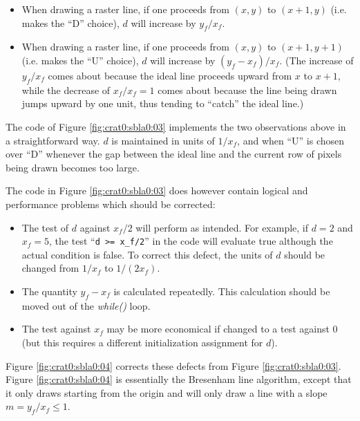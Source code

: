 \begin{itemize}
\item When drawing a raster line, if one proceeds from 
      $(x, y)$ to $(x+1, y)$ (i.e. makes the ``D'' choice),
      $d$ will increase by $y_f/x_f$.
\item When drawing a raster line, if one proceeds from
      $(x,y)$ to $(x+1, y+1)$ (i.e. makes the ``U'' choice),
      $d$ will increase by $(y_f - x_f)/x_f$.  (The increase
      of $y_f/x_f$ comes about because the ideal line proceeds
      upward from $x$ to $x+1$, while the decrease of $x_f/x_f = 1$
      comes about because the line being drawn jumps upward by one
      unit, thus tending to ``catch'' the ideal line.)
\end{itemize} 

The code of Figure \ref{fig:crat0:sbla0:03} implements the 
two observations above in a straightforward way.  $d$ is maintained
in units of $1/x_f$, and when ``U'' is chosen over ``D'' whenever
the gap between the ideal line and the current row of pixels
being drawn becomes too large.

The code in Figure \ref{fig:crat0:sbla0:03} does however contain logical
and performance problems which should be corrected:

\begin{itemize}
\item The test of $d$ against $x_f/2$ will perform as intended.
      For example, if $d=2$ and $x_f=5$, the test
      ``\texttt{d >= x\_f/2}'' in the code will evaluate true
      although the actual condition is false.  To correct this
      defect, the units of $d$ should be changed from 
      $1/x_f$ to $1/(2 x_f)$.
\item The quantity $y_f - x_f$ is calculated repeatedly.  This
      calculation should be moved out of the \emph{while()} loop.
\item The test against $x_f$ may be more economical if changed to
      a test against 0 (but this requires a different initialization
      assignment for $d$).
\end{itemize}

Figure \ref{fig:crat0:sbla0:04} corrects these defects
from Figure \ref{fig:crat0:sbla0:03}.
Figure \ref{fig:crat0:sbla0:04} is essentially the Bresenham
line algorithm, except that it only draws starting from the
origin and will only draw a line with a slope
$m = y_f/x_f \leq 1$.

